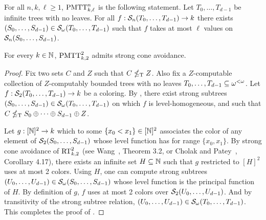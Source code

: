 \begin{statement}
	For all $n,k,\ell \geq 1$, $\mathrm{PMTT}^{n}_{k,\ell}$ is the following statement. Let $T_0,\ldots,T_{d-1}$ be infinite trees with no leaves. For all $f: \mathcal{S}_{n}({T_0,\ldots,T_{d-1}}) \to k$ there exists $(S_0,\ldots,S_{d-1}) \in \mathcal{S}_{\omega}({T_0,\ldots,T_{d-1}})$ such that $f$ takes at most $\ell$ values on $\mathcal{S}_{n}({S_0,\ldots,S_{d-1}})$.\end{statement}

\begin{theorem}\label{thm:pmtt2k2-strong-cone-avoidance}
For every $k \in \mathbb{N}$, $\mathrm{PMTT}^{2}_{k,2}$ admits strong cone avoidance.
\end{theorem}
\begin{proof}
Fix two sets $C$ and $Z$ such that $C \nleq_{\text{\upshape T}} Z$.
Also fix a $Z$-computable collection of $Z$-computably bounded trees with no leaves $T_0, \dots,\allowbreak T_{d-1} \subseteq {\omega^{<\omega}}$.
Let $f: \mathcal{S}_{2}({T_0, \dots, T_{d-1}}) \to k$ be a coloring.
By , there exist strong
  subtrees $(S_0, \dots, S_{d-1}) \in \mathcal{S}_{\omega}({T_0, \dots, T_{d-1}})$ on which $f$ is level-homogeneous, and such that
  $C \nleq_{\text{\upshape T}} S_0 \oplus \dots \oplus S_{d-1} \oplus Z$.

Let  $g: [\mathbb{N}]^2 \to k$ which to some $\{x_0 < x_1\} \in [\mathbb{N}]^2$ associates 
the color of any element of $\mathcal{S}_{2}({S_0, \dots, S_{d-1}})$ whose level 
function has for range $\{x_0, x_1\}$. By strong cone avoidance of $\mathrm{RT}^{2}_{k,2}$ (see Wang~\cite{Wang2014Some}, Theorem 3.2, or Cholak and Patey~\cite{Cholak2019Thin}, Corollary 4.17),
there exists an infinite set $H \subseteq \mathbb{N}$ such that $g$ restricted to $[H]^2$
uses at most 2 colors. Using $H$, one can compute strong subtrees $(U_0, \dots, U_{d-1}) \in \mathcal{S}_{\omega}({S_0, \dots, S_{d-1}})$ whose level function is the principal function of $H$.
By definition of $g$, $f$ uses at most 2 colors over $\mathcal{S}_{2}({U_0, \dots, U_{d-1}})$.
And by transitivity of the strong subtree relation, $(U_0, \dots, U_{d-1}) \in \mathcal{S}_{\omega}({T_0, \dots, T_{d-1}})$. 
This completes the proof of .
\end{proof}%


